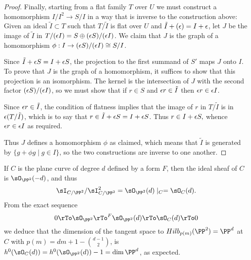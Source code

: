 \begin{proof}
Finally, starting from a flat family $T$ over $U$ we must construct a homomorphism $I/I^2 \to S/I$  in a way that is inverse to the construction above: Given an ideal $\tilde I \subset T$ such that $T/\tilde I$ is flat over $U$ and $\tilde I + (\eps) = I +\eps$, 
let $J$ be the image of $\tilde I$ in $T/(\eps I) = S \oplus (\eps S)/(\eps I)$. We claim that $J$ is the graph of a homomorphism $\phi: I \to  (\eps S)/(\eps I) \cong S/I$. 

Since $\tilde I + \eps S = I +\eps S$,  the projection  to the first  summand of $S'$ maps $J$ onto $I$. 
To prove that $J$ is the graph of a homomorphism, it suffices to show that this projection is an isomorphism.
The kernel is
the intersection of $J$ with the second factor $(\eps S)/(\eps I )$, so we must show that
if $r\in S$ and $\eps r \in \tilde I$ then $\eps r \in \eps I$. 

Since $\eps r \in \tilde I$, the condition of flatness implies
that the image of $r$ in $T/\tilde I$ is in $\eps(T/\tilde I)$, which is to say that $r \in \tilde I + \eps S = I +\eps S$.
Thus $r \in  I + \eps S,$ whence $\eps  r \in \eps I$ as required.

Thus
$J$ defines a homomorphism $\phi$ as claimed, which means that
 $\tilde I$ is generated by $\{g+\phi g\mid g\in I\}$, so the two constructions are inverse to one another.
\end{proof}

\begin{example}\label{Hilb for plane curves-continued}
If $C$ is the plane curve of degree $d$ defined by a form $F$, then the ideal sheaf of $C$ is $\sO_{\PP^2}(-d)$, and thus
$$
\sI_{C/\PP^2}/\sI_{C/\PP^2}^2 = \sO_{\PP^2}(d)\mid_C = \sO_C(d).
$$
From the exact sequence 
$$
0\rTo\sO_{\PP^2}\rTo^F\sO_{\PP^2}(d) \rTo\sO_C(d)\rTo 0
$$
we deduce that the dimension of the tangent space to $Hilb_{p(m)}(\PP^2)=\PP^d$  at $C$
with $p(m) = dm+1-{d-1\choose 2}$,
is $h^0(\sO_C(d)) = h^0(\sO_{\PP^2}(d))-1 = \dim \PP^d$, as expected.
\end{example}

\

